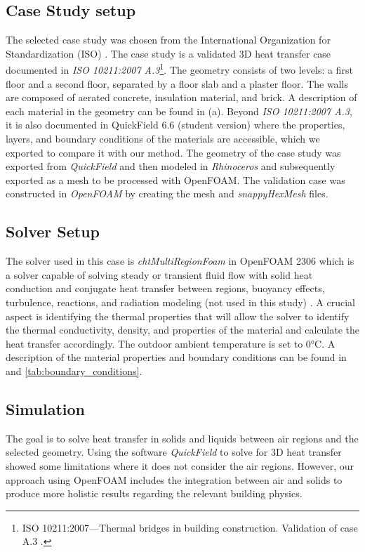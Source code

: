 \documentclass[runningheads]{llncs}
\begin{document}
    
\subsection{Case Study setup}

The selected case study was chosen from the International Organization for Standardization (ISO) \cite{ISO}. The case study is a validated 3D heat transfer case documented in \textit{ISO 10211:2007 A.3}\footnote{ISO 10211:2007---Thermal bridges in building construction. Validation of case A.3 \cite{ISO}.}. The geometry consists of two levels: a first floor and a second floor, separated by a floor slab and a plaster floor. The walls are composed of aerated concrete, insulation material, and brick.
A description of each material in the geometry can be found in  (a). Beyond \textit{ISO 10211:2007 A.3}, it is also documented in QuickField 6.6 (student version) where the properties, layers, and boundary conditions of the materials are accessible, which we exported to compare it with our method. 
The geometry of the case study was exported from \textit{QuickField} and then modeled in \textit{Rhinoceros} and subsequently exported as a mesh to be processed with OpenFOAM. 
The validation case was constructed in \textit{OpenFOAM} by creating the mesh and \textit{snappyHexMesh} files.  

\subsection{Solver Setup}


The solver used in this case is \textit{chtMultiRegionFoam} in OpenFOAM 2306 which is a solver capable of solving steady or transient fluid flow with solid heat conduction and conjugate heat transfer between regions, buoyancy effects, turbulence, reactions, and radiation modeling (not used in this study) \cite{cht}. 
A crucial aspect is identifying the thermal properties that will allow the solver to identify the thermal conductivity, density, and properties of the material and calculate the heat transfer accordingly.
The outdoor ambient temperature is set to 0°C.  
A description of the material properties and boundary conditions can be found in  and \ref{tab:boundary_conditions}. 


\subsection{Simulation}
The goal is to solve heat transfer in solids and liquids between air regions and the selected geometry. Using the software \textit{QuickField}  to solve for 3D heat transfer showed some limitations where it does not consider the air regions. However, our approach using OpenFOAM includes the integration between air and solids to produce more holistic results regarding the relevant building physics. 
\end{document}

